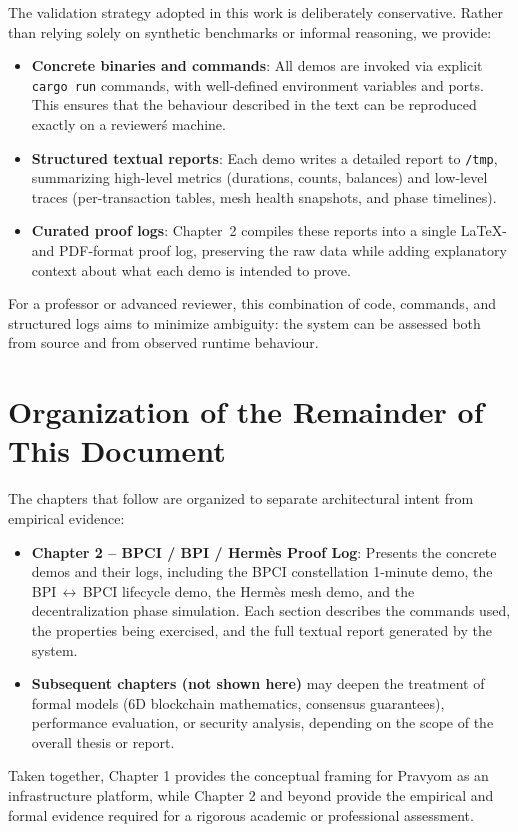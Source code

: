 The validation strategy adopted in this work is deliberately conservative. Rather than relying solely on synthetic benchmarks or informal reasoning, we provide:

\begin{itemize}
  \item \textbf{Concrete binaries and commands}: All demos are invoked via explicit \texttt{cargo run} commands, with well-defined environment variables and ports. This ensures that the behaviour described in the text can be reproduced exactly on a reviewer\'s machine.
  \item \textbf{Structured textual reports}: Each demo writes a detailed report to \texttt{/tmp}, summarizing high-level metrics (durations, counts, balances) and low-level traces (per-transaction tables, mesh health snapshots, and phase timelines).
  \item \textbf{Curated proof logs}: Chapter~2 compiles these reports into a single LaTeX- and PDF-format proof log, preserving the raw data while adding explanatory context about what each demo is intended to prove.
\end{itemize}

For a professor or advanced reviewer, this combination of code, commands, and structured logs aims to minimize ambiguity: the system can be assessed both from source and from observed runtime behaviour.

\section{Organization of the Remainder of This Document}

The chapters that follow are organized to separate architectural intent from empirical evidence:

\begin{itemize}
  \item \textbf{Chapter 2 -- BPCI / BPI / Herm\`es Proof Log}: Presents the concrete demos and their logs, including the BPCI constellation 1-minute demo, the BPI\,$\leftrightarrow$\,BPCI lifecycle demo, the Herm\`es mesh demo, and the decentralization phase simulation. Each section describes the commands used, the properties being exercised, and the full textual report generated by the system.
  \item \textbf{Subsequent chapters (not shown here)} may deepen the treatment of formal models (6D blockchain mathematics, consensus guarantees), performance evaluation, or security analysis, depending on the scope of the overall thesis or report.
\end{itemize}

Taken together, Chapter 1 provides the conceptual framing for Pravyom as an infrastructure platform, while Chapter 2 and beyond provide the empirical and formal evidence required for a rigorous academic or professional assessment.
